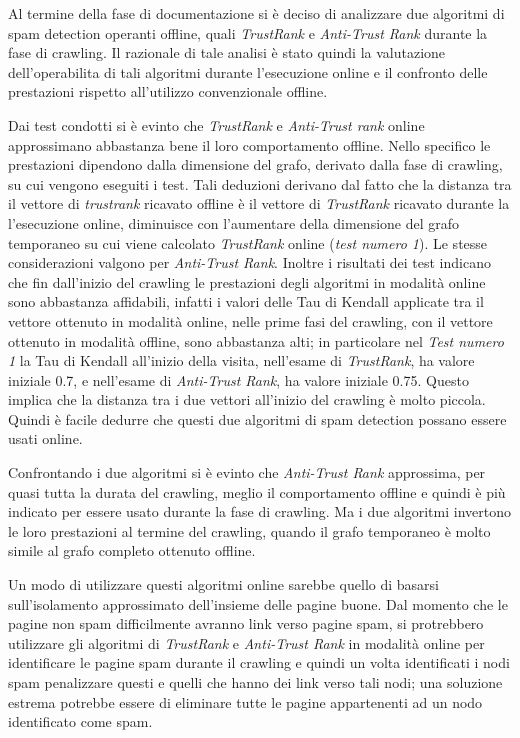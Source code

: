 Al termine della fase di documentazione si è deciso di analizzare due algoritmi di spam detection operanti offline, quali \textit{TrustRank} e \textit{Anti-Trust Rank} durante la fase di crawling. Il razionale di tale analisi è stato quindi la valutazione dell'operabilita di tali algoritmi durante l'esecuzione online e il confronto delle prestazioni rispetto all'utilizzo convenzionale offline.

Dai test condotti si è evinto che \textit{TrustRank} e \textit{Anti-Trust rank} online approssimano abbastanza bene il loro comportamento offline. Nello specifico le prestazioni dipendono dalla dimensione del grafo, derivato dalla fase di crawling, su cui vengono eseguiti i test. Tali deduzioni derivano dal fatto che la distanza tra il vettore di \textit{trustrank} ricavato offline è il vettore di \textit{TrustRank} ricavato durante la l'esecuzione online, diminuisce con l'aumentare della dimensione del grafo temporaneo su cui viene calcolato \textit{TrustRank} online (\textit{test numero 1}). Le stesse considerazioni valgono per \textit{Anti-Trust Rank}. Inoltre i risultati dei test  indicano che fin dall'inizio del crawling le prestazioni degli algoritmi in modalità online sono abbastanza affidabili, infatti i valori delle Tau di Kendall applicate tra il vettore ottenuto in modalità online, nelle prime fasi del crawling, con il vettore ottenuto in modalità offline, sono abbastanza alti; in particolare nel \textit{Test numero 1} la Tau di Kendall all'inizio della visita,  nell'esame di \textit{TrustRank}, ha valore iniziale 0.7, e nell'esame di \textit{Anti-Trust Rank}, ha  valore iniziale 0.75. Questo implica che la distanza tra i due vettori all'inizio del crawling è molto piccola. Quindi è facile dedurre che questi due algoritmi di spam detection possano essere usati online.

Confrontando i due algoritmi si è evinto che \textit{Anti-Trust Rank} approssima, per quasi tutta la durata del crawling, meglio il comportamento offline e quindi è più indicato per essere usato durante la fase di crawling. Ma i due algoritmi invertono le loro prestazioni al termine del crawling, quando il grafo temporaneo è molto simile al grafo completo ottenuto offline.

Un modo di utilizzare questi algoritmi online sarebbe quello di basarsi sull'isolamento approssimato dell'insieme delle pagine buone. Dal momento che le pagine non spam difficilmente avranno link verso pagine spam, si protrebbero utilizzare gli algoritmi di \textit{TrustRank} e \textit{Anti-Trust Rank} in modalità online per identificare le pagine spam durante il crawling e quindi un volta identificati i nodi spam penalizzare questi e quelli che hanno dei link verso tali nodi; una soluzione estrema potrebbe essere di eliminare tutte le pagine appartenenti ad un nodo identificato come spam.

